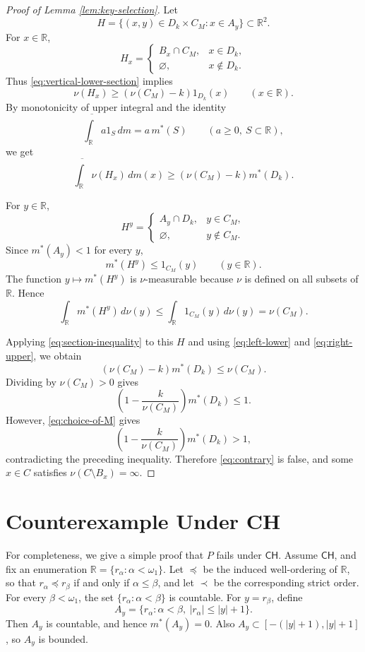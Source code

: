 \documentclass{amsart}
\theoremstyle{plain}
\theoremstyle{definition}
\newcommand{\R}{\mathbb{R}}
\newcommand{\CH}{\mathsf{CH}}
\begin{document}
\begin{proof}[Proof of Lemma \ref{lem:key-selection}]
Let
\[
H=\{(x,y)\in D_k\times C_M:x\in A_y\}\subset\R^2.
\]
For $x\in\R$,
\[
H_x=
\begin{cases}
B_x\cap C_M, & x\in D_k,\\
\varnothing, & x\notin D_k.
\end{cases}
\]
Thus \eqref{eq:vertical-lower-section} implies
\[
\nu(H_x)\ge(\nu(C_M)-k)1_{D_k}(x)
\qquad(x\in\R).
\]
By monotonicity of upper integral and the identity
\[
\overline{\int_\R} a1_S\,dm=a\,m^*(S)
\qquad(a\ge0,
\ S\subset\R),
\]
we get
\begin{equation}\label{eq:left-lower}
\overline{\int_\R}\nu(H_x)\,dm(x)
\ge
(\nu(C_M)-k)m^*(D_k).
\end{equation}

For $y\in\R$,
\[
H^y=
\begin{cases}
A_y\cap D_k, & y\in C_M,\\
\varnothing, & y\notin C_M.
\end{cases}
\]
Since $m^*(A_y)<1$ for every $y$,
\[
m^*(H^y)
\le
1_{C_M}(y)
\qquad(y\in\R).
\]
The function $y\mapsto m^*(H^y)$ is $\nu$-measurable because $\nu$ is defined on all subsets of $\R$.
Hence
\begin{equation}\label{eq:right-upper}
\int_\R m^*(H^y)\,d\nu(y)
\le
\int_\R 1_{C_M}(y)\,d\nu(y)
=
\nu(C_M).
\end{equation}

Applying \eqref{eq:section-inequality} to this $H$ and using \eqref{eq:left-lower} and \eqref{eq:right-upper}, we obtain
\[
(\nu(C_M)-k)m^*(D_k)
\le
\nu(C_M).
\]
Dividing by $\nu(C_M)>0$ gives
\[
\left(1-\frac{k}{\nu(C_M)}\right)m^*(D_k)
\le
1.
\]
However, \eqref{eq:choice-of-M} gives
\[
\left(1-\frac{k}{\nu(C_M)}\right)m^*(D_k)>1,
\]
contradicting the preceding inequality.
Therefore \eqref{eq:contrary} is false, and some $x\in C$ satisfies $\nu(C\setminus B_x)=\infty$.
\end{proof}

\appendix

\section{Counterexample Under CH}\label{sec:ch-counterexample}

For completeness, we give a simple proof that $P$ fails under $\CH$.
Assume $\CH$, and fix an enumeration $\R=\{r_\alpha:\alpha<\omega_1\}$.
Let $\preceq$ be the induced well-ordering of $\R$, so that $r_\alpha\preceq r_\beta$ if and only if $\alpha\le\beta$, and let $\prec$ be the corresponding strict order.
For every $\beta<\omega_1$, the set $\{r_\alpha:\alpha<\beta\}$ is countable.
For $y=r_\beta$, define
\[
A_y
=
\{r_\alpha:\alpha<\beta,\ |r_\alpha|\le |y|+1\}.
\]
Then $A_y$ is countable, and hence $m^*(A_y)=0$.
Also $A_y\subset[-(|y|+1),|y|+1]$, so $A_y$ is bounded.
\end{document}
